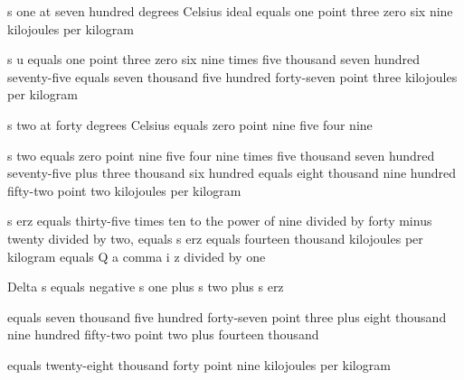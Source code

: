 s one at seven hundred degrees Celsius ideal equals one point three zero six nine kilojoules per kilogram

s u equals one point three zero six nine times five thousand seven hundred seventy-five equals seven thousand five hundred forty-seven point three kilojoules per kilogram

s two at forty degrees Celsius equals zero point nine five four nine

s two equals zero point nine five four nine times five thousand seven hundred seventy-five plus three thousand six hundred equals eight thousand nine hundred fifty-two point two kilojoules per kilogram

s erz equals thirty-five times ten to the power of nine divided by forty minus twenty divided by two, equals s erz equals fourteen thousand kilojoules per kilogram equals Q a comma i z divided by one

Delta s equals negative s one plus s two plus s erz

equals seven thousand five hundred forty-seven point three plus eight thousand nine hundred fifty-two point two plus fourteen thousand

equals twenty-eight thousand forty point nine kilojoules per kilogram